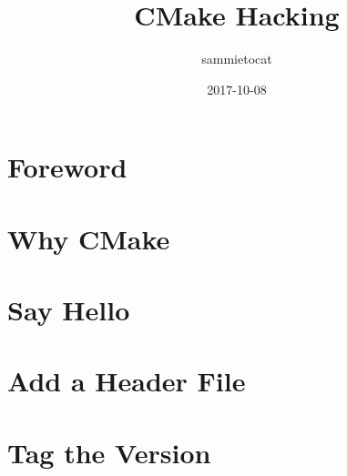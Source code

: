 \documentclass[a4paper,10pt]{book}
\title{CMake Hacking}
\author{sammietocat}
\date{2017-10-08}
\begin{document}
\maketitle
\tableofcontents

\iffalse
\begin{mquote}
  Hello Box
\end{mquote}
\fi

\chapter*{Foreword}
  

\chapter{Why CMake}
  

\chapter{Say Hello}
  

\chapter{Add a Header File}
  

\chapter{Tag the Version}
  

\end{document}

